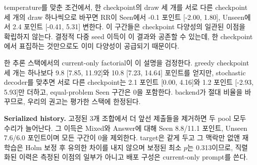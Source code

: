 \documentclass[10pt,conference]{IEEEtran}
\begin{document}
temperature를 맞춘 조건에서, 한 checkpoint의 draw 세 개를 서로 다른 checkpoint 세 개의 draw 하나씩으로 바꾸면 RR이 Seen에서 -0.1 포인트 [-2.00, 1.80], Unseen에서 2.4 포인트 [-0.41, 5.31] 변한다. 이 구간들은 checkpoint 다양성의 일관된 이점을 확립하지 않는다. 결정적 다중 seed 이득이 이 결과와 공존할 수 있는데, 한 checkpoint에서 표집하는 것만으로도 이미 다양성이 공급되기 때문이다.

한 추론 스택에서의 current-only factorial이 이 설명을 검정한다. greedy checkpoint 세 개는 하나보다 9.8 [7.85, 11.92]와 10.8 [7.23, 14.64] 포인트를 얻지만, stochastic decoder를 맞추면 서로 다른 checkpoint는 2.1 포인트 [0.00, 4.16]와 1.2 포인트 [-2.93, 5.93]만 더하고, equal-problem Seen 구간은 0을 포함한다. backend가 절대 비율을 바꾸므로, 우리의 권고는 평가한 스택에 한정된다.

\noindent\textbf{Serialized history.} 고정된 3개 조합에서 더 앞선 제출들을 제거하면 두 pool 모두 수리가 늘어난다. 그 이득은 Mixed와 Answer에 대해 Seen 8.8/11.1 포인트, Unseen 7.6/6.0 포인트이며 모든 구간이 0을 제외한다. target은 같게 두고 그 맥락만 없앤 재학습은 Holm 보정 후 유의한 차이를 내지 않으며 보정된 최소 \(p\)는 0.313이므로, 직렬화된 이력은 측정된 이점의 일부가 아니고 배포 구성은 current-only prompt를 쓴다.
\end{document}

